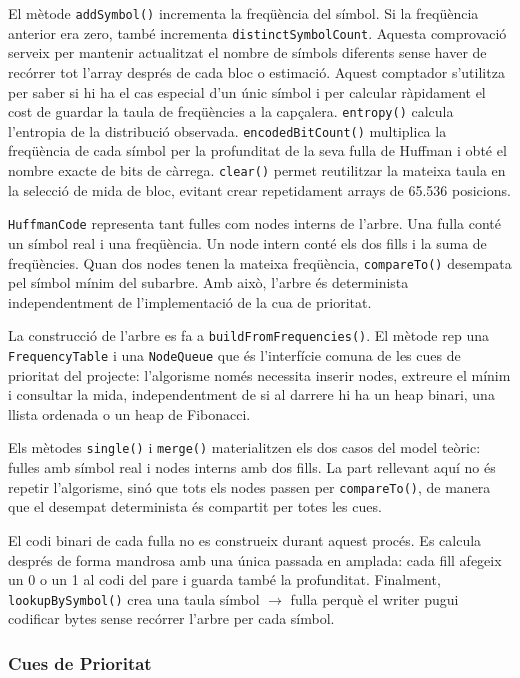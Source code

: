 \documentclass[conference,compsoc]{IEEEtran}
\begin{document}
El mètode \texttt{addSymbol()} incrementa la freqüència del símbol. Si la
freqüència anterior era zero, també incrementa \texttt{distinctSymbolCount}.
Aquesta comprovació serveix per mantenir actualitzat el nombre de símbols
diferents sense haver de recórrer tot l'array després de cada bloc o
estimació. Aquest comptador s'utilitza per saber si hi ha el cas especial
d'un únic símbol i per calcular ràpidament el cost de guardar la taula de
freqüències a la capçalera. \texttt{entropy()} calcula l'entropia de la
distribució observada. \texttt{encodedBitCount()} multiplica la freqüència
de cada símbol per la profunditat de la seva fulla de Huffman i obté el
nombre exacte de bits de càrrega. \texttt{clear()} permet reutilitzar la
mateixa taula en la selecció de mida de bloc, evitant crear repetidament
arrays de 65.536 posicions.

\texttt{HuffmanCode} representa tant fulles com nodes interns de l'arbre.
Una fulla conté un símbol real i una freqüència. Un node intern conté els
dos fills i la suma de freqüències. Quan dos nodes tenen la mateixa
freqüència, \texttt{compareTo()} desempata pel símbol mínim del subarbre.
Amb això, l'arbre és determinista independentment de l'implementació de
la cua de prioritat.

La construcció de l'arbre es fa a \texttt{buildFromFrequencies()}. El
mètode rep una \texttt{FrequencyTable} i una \texttt{NodeQueue} que
és l'interfície comuna de les cues de prioritat del
projecte: l'algorisme només necessita inserir nodes, extreure el mínim i
consultar la mida, independentment de si al darrere hi ha un heap binari,
una llista ordenada o un heap de Fibonacci.

Els mètodes \texttt{single()} i \texttt{merge()} materialitzen els dos casos
del model teòric: fulles amb símbol real i nodes interns amb dos fills. La
part rellevant aquí no és repetir l'algorisme, sinó que tots els nodes
passen per \texttt{compareTo()}, de manera que el desempat determinista és
compartit per totes les cues.

El codi binari de cada fulla no es construeix durant aquest procés. Es
calcula després de forma mandrosa amb una única passada en amplada: cada
fill afegeix un 0 o un 1 al codi del pare i guarda també la profunditat.
Finalment, \texttt{lookupBySymbol()} crea una taula
símbol $\rightarrow$ fulla perquè el writer pugui codificar bytes sense
recórrer l'arbre per cada símbol.


\subsubsection{Cues de Prioritat}
\end{document}
